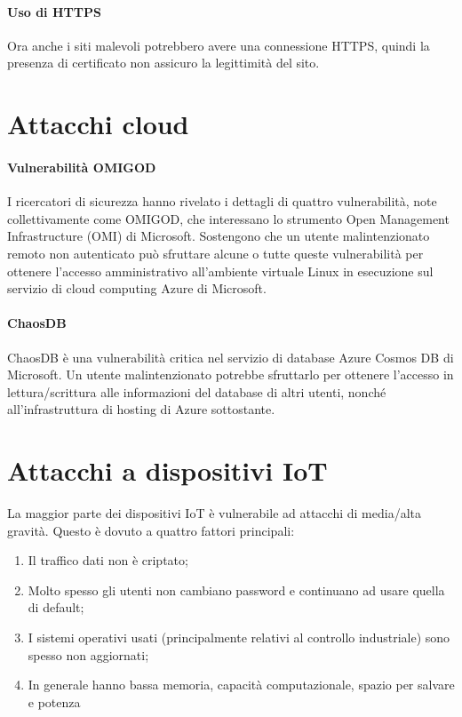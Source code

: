 \paragraph{Uso di HTTPS} Ora anche i siti malevoli potrebbero avere una connessione HTTPS, quindi la presenza di certificato non assicuro la legittimità del sito. 

\section{Attacchi cloud}
\paragraph{Vulnerabilità OMIGOD} I ricercatori di sicurezza hanno rivelato i dettagli di quattro vulnerabilità, note collettivamente come OMIGOD, che interessano lo strumento Open Management Infrastructure (OMI) di Microsoft. Sostengono che un utente malintenzionato remoto non autenticato può sfruttare alcune o tutte queste vulnerabilità per ottenere l'accesso amministrativo all'ambiente virtuale Linux in esecuzione sul servizio di cloud computing Azure di Microsoft.

\paragraph{ChaosDB} ChaosDB è una vulnerabilità critica nel servizio di database Azure Cosmos DB di Microsoft. Un utente malintenzionato potrebbe sfruttarlo per ottenere l'accesso in lettura/scrittura alle informazioni del database di altri utenti, nonché all'infrastruttura di hosting di Azure sottostante.

\section{Attacchi a dispositivi IoT}

La maggior parte dei dispositivi IoT è vulnerabile ad attacchi di media/alta gravità. Questo è dovuto a quattro fattori principali:
\begin{enumerate}
    \item Il traffico dati non è criptato;
    \item Molto spesso gli utenti non cambiano password e continuano ad usare quella di default;
    \item I sistemi operativi usati (principalmente relativi al controllo industriale) sono spesso non aggiornati;
    \item In generale hanno bassa memoria, capacità computazionale, spazio per salvare e potenza
\end{enumerate}

